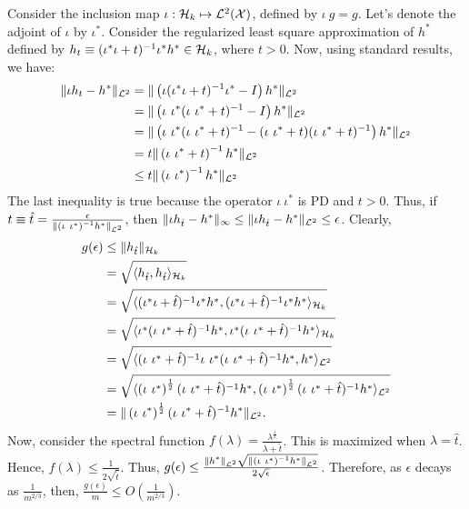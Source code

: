 Consider the inclusion map $\iota:\mathcal{H}_k\mapsto\mathcal{L}^2(\mathcal{X})$, defined by $\iota\ g=g$. Let's denote the adjoint of $\iota$ by $\iota^*$. Consider the regularized least square approximation of $h^*$ defined by $h_t\equiv(\iota^*\iota+t)^{-1}\iota^*h^*\in\mathcal{H}_k$, where $t>0$. Now, using standard results, we have:
\begin{align*}
    \|\iota h_t-h^*\|_{\calL^2}&=\|\left(\iota(\iota^*\iota+t)^{-1}\iota^*-I\right)h^*\|_{\calL^2}\\
    &=\|\left(\iota\ \iota^*(\iota\ \iota^*+t)^{-1}-I\right)h^*\|_{\calL^2}\\
    &=\|\left(\iota\ \iota^*(\iota\ \iota^*+t)^{-1}-(\iota\ \iota^*+t)(\iota\ \iota^*+t)^{-1}\right)h^*\|_{\calL^2}\\
    &=t\|\left(\iota\ \iota^*+t\right)^{-1}h^*\|_{\calL^2}\\
    &\le t\|\left(\iota\ \iota^*\right)^{-1}h^*\|_{\calL^2}\\
\end{align*}
The last inequality is true because the operator $\iota\ \iota^*$ is PD and $t>0$. Thus, if $t\equiv \hat{t}=\frac{\epsilon}{\|\left(\iota\ \iota^*\right)^{-1}h^*\|_{\calL^2}}$, then $\|\iota h_{\hat{t}} -h^*\|_\infty\le\|\iota h_{\hat{t}}-h^*\|_{\mathcal{L}^2}\le\epsilon$. Clearly, 
\allowdisplaybreaks
\begin{align*}
 g(\epsilon)&\le\|h_{\hat{t}}\|_{\calH_k}\\
 &=\sqrt{\langle h_{\hat{t}},h_{\hat{t}}\rangle_{\calH_k}}\\
 &=\sqrt{\langle (\iota^*\iota+\hat{t})^{-1}\iota^*h^*,(\iota^*\iota+\hat{t})^{-1}\iota^*h^*\rangle_{\calH_k}}\\
 &=\sqrt{\langle \iota^*(\iota\ \iota^*+\hat{t})^{-1}h^*,\iota^*(\iota\ \iota^*+\hat{t})^{-1}h^*\rangle_{\calH_k}}\\
 &=\sqrt{\langle (\iota\ \iota^*+\hat{t})^{-1}\iota\ \iota^*(\iota\ \iota^*+\hat{t})^{-1}h^*,h^*\rangle_{\calL^2}}\\
 &=\sqrt{\langle \left(\iota\ \iota^*\right)^\frac{1}{2}(\iota\ \iota^*+\hat{t})^{-1}h^*,\left(\iota\ \iota^*\right)^\frac{1}{2}(\iota\ \iota^*+\hat{t})^{-1}h^*\rangle_{\calL^2}}\\
 &=\|\left(\iota\ \iota^*\right)^\frac{1}{2}(\iota\ \iota^*+\hat{t})^{-1}h^*\|_{\calL^2}.
\end{align*}
Now, consider the spectral function $f(\lambda)=\frac{\lambda^\frac{1}{2}}{\lambda+\hat{t}}$. This is maximized when $\lambda=\hat{t}$. Hence, $f(\lambda)\le\frac{1}{2\sqrt{\hat{t}}}$. Thus, $g(\epsilon)\le\frac{\|h^*\|_{\calL^2}\sqrt{\|\left(\iota\ \iota^*\right)^{-1}h^*\|_{\calL^2}}}{2\sqrt{\epsilon}}$. Therefore, as $\epsilon$ decays as $\frac{1}{m^{2/3}}$, then, $\frac{g(\epsilon)}{m}\le O\left(\frac{1}{m^{2/3}}\right)$.

